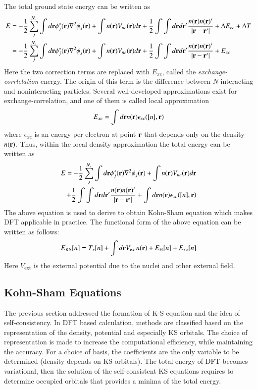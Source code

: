The total ground state energy can be written as
\begin{equation}
\begin{split}
E  & = -\frac{1}{2}\sum_j^{N_e} \int d\vb{r} \phi^{\ast}_j (\vb{r})\nabla^2 \phi_j(\vb{r}) + \int n(\vb{r})V_{ne}(\vb{r})d\vb{r} +  \frac{1}{2}\int\int d\vb{r}d\vb{r}' \frac{n(\vb{r})n(\vb{r})'}{\abs{\vb{r}-\vb{r}'}} + \Delta E_{ee} + \Delta T \\
   & =-\frac{1}{2}\sum_j^{N_e} \int d\vb{r} \phi^{\ast}_j (\vb{r})\nabla^2 \phi_j(\vb{r}) + \int n(\vb{r})V_{ne}(\vb{r})d\vb{r} +  \frac{1}{2}\int\int d\vb{r}d\vb{r}' \frac{n(\vb{r})n(\vb{r})'}{\abs{\vb{r}-\vb{r}'}} + E_{xc}
\end{split}
\end{equation}
Here the two correction terms are replaced with $E_{xc}$, called the \textit{exchange-corrlelation} energy. The origin of this term is the difference between $N$ interacting and noninteracting particles. Several well-developed approximations exist for exchange-correlation, and one of them is called local approximation
\begin{equation}\label{ldaeqn}
E_{xc} = \int d\vb{r} n(\vb{r})\epsilon_{xc}([n],\vb{r})
\end{equation}
where $\epsilon_{xc}$ is an energy per electron at point $\vb{r}$ that depends only on the density $n(\vb{r})$. Thus, within the local density approximation the total energy can be written as
\begin{align}\label{toteeqn}
\begin{split}
E=-\frac{1}{2}\sum_j^{N_e} \int d\vb{r} \phi^{\ast}_j (\vb{r})\nabla^2 \phi_j(\vb{r}) + \int n(\vb{r})V_{ne}(\vb{r})d\vb{r}  \\
+ \frac{1}{2}\int\int d\vb{r}d\vb{r}' \frac{n(\vb{r})n(\vb{r})'}{\abs{\vb{r}-\vb{r}'}} + \int d\vb{r} n(\vb{r})\epsilon_{xc}([n],\vb{r})
\end{split}
\end{align}
The above equation is used to derive to obtain Kohn-Sham equation which makes DFT applicable in practice. The functional form of the above equation can be written as follows:
\begin{equation}
E_{\text{KS}}[n] = T_s[n] + \int d\vb{r} V_{\text{ext}}n(\vb{r}) + E_{\text{H}}[n] + E_{\text{xc}}[n]
\end{equation}
Here $V_{\text{ext}}$ is the external potential due to the nuclei and other external field.


\subsection{Kohn-Sham Equations}
The previous section addressed the formation of K-S equation and the idea of self-consistency. In DFT based calculation, methods are classified based on the representation of the density, potential and especially KS orbitals. The choice of representation is made to increase the computational efficiency, while maintaining the accuracy.
For a choice of basis, the coefficients are the only variable to be determined (density depends on KS orbitals). The total energy of DFT becomes variational, then the solution of the self-consistent KS equations requires to determine occupied orbitals that provides a minima of the total energy.

